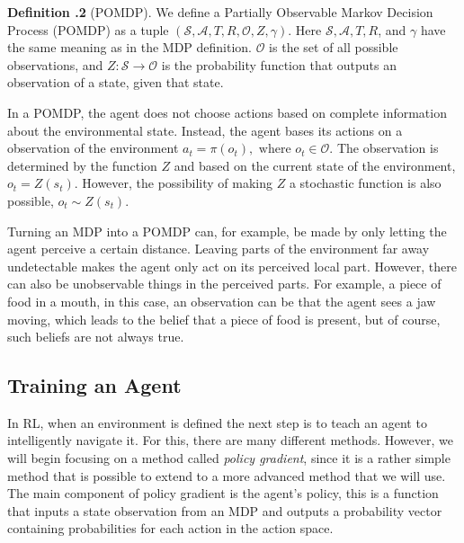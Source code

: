 \documentclass[12pt,A4]{report}
\theoremstyle{definition}
\newtheorem{definition}{Definition}[section]
\begin{document}
\begin{displayquote}
  \textbf{Definition \thesection.2} (POMDP). We define a Partially Observable Markov Decision Process (POMDP) as a tuple $(\mathcal{S}, \mathcal{A}, T, R, \mathcal{O}, Z, \gamma)$. Here $\mathcal{S}, \mathcal{A}, T, R$, and $\gamma$ have the same meaning as in the MDP definition. $\mathcal{O}$ is the set of all possible observations, and $Z : \mathcal{S} \rightarrow \mathcal{O}$ is the probability function that outputs an observation of a state, given that state. 
\end{displayquote}
In a POMDP, the agent does not choose actions based on complete information about the environmental state. Instead, the agent bases its actions on a observation of the environment $a_t = \pi(o_t), \text{ where } o_t \in \mathcal{O}$. The observation is determined by the function $Z$ and based on the current state of the environment, $o_t = Z(s_t)$. However, the possibility of making $Z$ a stochastic function is also possible, $o_t \sim Z(s_t)$.

Turning an MDP into a POMDP can, for example, be made by only letting the agent perceive a certain distance. Leaving parts of the environment far away undetectable makes the agent only act on its perceived local part. However, there can also be unobservable things in the perceived parts. For example, a piece of food in a mouth, in this case, an observation can be that the agent sees a jaw moving, which leads to the belief that a piece of food is present, but of course, such beliefs are not always true. 


\subsection{Training an Agent}

In RL, when an environment is defined the next step is to teach an agent to intelligently navigate it. For this, there are many different methods. However, we will begin focusing on a method called \textit{policy gradient}, since it is a rather simple method that is possible to extend to a more advanced method that we will use. The main component of policy gradient is the agent's policy, this is a function that inputs a state observation from an MDP and outputs a probability vector containing probabilities for each action in the action space. 
\end{document}

